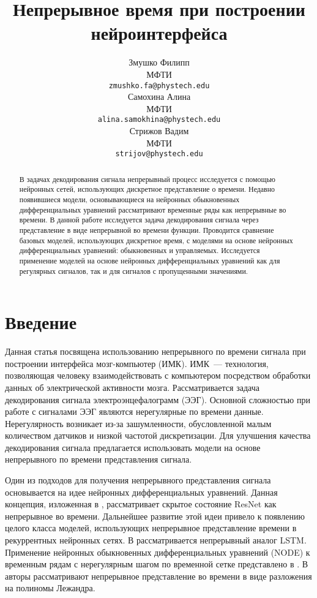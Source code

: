 \documentclass{article}
\title{Непрерывное время при построении нейроинтерфейса}
\author{ Змушко Филипп \\
	МФТИ \\
	\texttt{zmushko.fa@phystech.edu} \\
	\And
	Самохина Алина \\
	МФТИ\\
	\texttt{alina.samokhina@phystech.edu} \\
	\And
	Стрижов Вадим \\
	МФТИ\\
	\texttt{strijov@phystech.edu} \\
}
\date{}
\begin{document}
\maketitle

\begin{abstract}
	В задачах декодирования сигнала непрерывный процесс исследуется с помощью нейронных сетей, использующих дискретное представление о времени. Недавно появившиеся модели, основывающиеся на нейронных обыкновенных дифференциальных уравнений рассматривают временные ряды как непрерывные во времени.
    В данной работе исследуется задача декодирования сигнала через представление в виде непрерывной во времени функции. Проводится сравнение базовых моделей, использующих дискретное время, с моделями на основе нейронных дифференциальных уравнений: обыкновенных и управляемых. Исследуется применение моделей на основе нейронных дифференциальных уравнений как для регулярных сигналов, так и для сигналов с пропущенными значениями. 
\end{abstract}


\section{Введение}
Данная статья посвящена  использованию непрерывного по времени сигнала при построении интерфейса мозг-компьютер (ИМК). ИМК~--- технология, позволяющая человеку взаимодействовать с компьютером посредством обработки данных об электрической активности мозга. Рассматривается задача декодирования сигнала электроэнцефалограмм (ЭЭГ). Основной сложностью при работе с сигналами ЭЭГ являются нерегулярные по времени данные. Нерегулярность возникает из-за зашумленности, обусловленной малым количеством датчиков и низкой частотой дискретизации. Для улучшения качества декодирования сигнала предлагается использовать модели на основе непрерывного по времени представления сигнала.

Один из подходов для получения непрерывного представления сигнала основывается на идее нейронных дифференциальных уравнений. Данная концепция, изложенная в \cite{NEURIPS2018_69386f6b}, рассматривает скрытое состояние ResNet как непрерывное во времени. Дальнейшее развитие этой идеи привело к появлению целого класса моделей, использующих непрерывное представление времени в рекуррентных нейронных сетях. В \cite{lechner2020longterm} рассматривается непрерывный аналог LSTM. Применение нейронных обыкновенных дифференциальных уравнений (NODE) к временным рядам с нерегулярным шагом по временной сетке представлено в \cite{cde}. В \cite{NEURIPS2019_952285b9} авторы рассматривают непрерывное представление во времени в виде разложения на полиномы Лежандра. 
\end{document}
